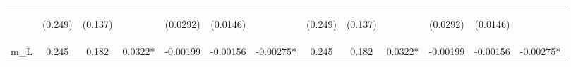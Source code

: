 \documentclass[]{article}
\begin{document}
\begin{center}
\begin{tabular}{lcccccccccccc}
\vspace{4pt} & \begin{footnotesize}(0.249)\end{footnotesize} & \begin{footnotesize}(0.137)\end{footnotesize} & \begin{footnotesize}\end{footnotesize} & \begin{footnotesize}(0.0292)\end{footnotesize} & \begin{footnotesize}(0.0146)\end{footnotesize} & \begin{footnotesize}\end{footnotesize} & \begin{footnotesize}(0.249)\end{footnotesize} & \begin{footnotesize}(0.137)\end{footnotesize} & \begin{footnotesize}\end{footnotesize} & \begin{footnotesize}(0.0292)\end{footnotesize} & \begin{footnotesize}(0.0146)\end{footnotesize} & \begin{footnotesize}\end{footnotesize} \\
m\_L & 0.245 & 0.182 & 0.0322* & -0.00199 & -0.00156 & -0.00275* & 0.245 & 0.182 & 0.0322* & -0.00199 & -0.00156 & -0.00275* \\

\end{tabular}
\end{center}
\end{document}
